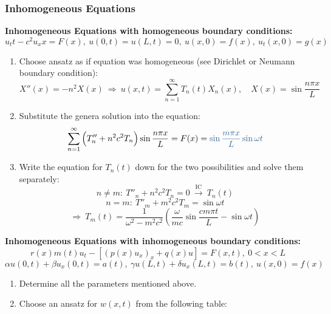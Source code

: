 \documentclass{article}
\begin{document}
\begin{twocolumn}
\subsubsection{Inhomogeneous Equations}

\textbf{Inhomogeneous Equations with homogeneous boundary conditions:}
$$u_tt - c^2 u_xx = F(x),\  u(0,t) = u(L,t) = 0, \ u(x,0) = f(x), \ u_t(x,0) = g(x)$$

\begin{enumerate}
	\item Choose ansatz as if equation was homogeneous (see Dirichlet or Neumann boundary condition):
	$$X''(x) = -n^2 X(x) \ \Rightarrow \ u(x,t) = \sum_{n=1}^{\infty} T_n(t) X_n(x), \quad X(x) = \sin \frac{n \pi x}{L}$$
	\item Substitute the genera solution into the equation:
	$$\sum_{n=1}^{\infty} \left( T''_n + n^2 c^2 T_n \right) \sin \frac{n \pi x}{L} = F(x) = \ex{\sin \frac{m \pi x}{L} \sin \omega t}$$
	\item Write the equation for $T_n(t)$ down for the two possibilities and solve them separately:
	$$n \neq m: \ T''_n + n^2 c^2 T_n = 0 \ \xrightarrow{\text{IC}} \  T_n(t)$$
	$$n = m: \ T''_m +m^2 c^2 T_m =\sin \omega t$$
	$$\Rightarrow \ T_m(t) = \frac{1}{\omega^2 - m^2 c^2} \left( \frac{\omega}{m c} \sin \frac{c m \pi t}{L} - \sin \omega t \right)$$
\end{enumerate}

\textbf{Inhomogeneous Equations with inhomogeneous boundary conditions:}
$$r(x)m(t)u_t - \left[ (p(x)u_x)_x + q(x) u \right] = F(x,t), \ 0 < x < L$$
$$\alpha u(0,t) + \beta u_x(0,t) = a(t), \ \gamma u(L,t) + \delta u_x(L,t) = b(t), \ u(x,0) = f(x)$$


\begin{enumerate}
	\item Determine all the parameters mentioned above.
	\item Choose an ansatz for $w(x,t)$ from the following table:
	

\end{enumerate}
\end{twocolumn}
\end{document}
